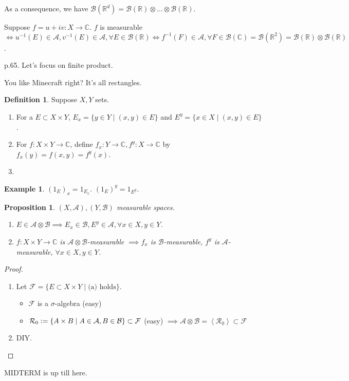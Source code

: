 \documentclass{report}
\newcommand{\R}{\mathbb{R}}
\newcommand{\C}{\mathbb{C}}
\newcommand{\cA}{\mathcal{A}}
\newcommand{\cB}{\mathcal{B}}
\newcommand{\gen}[1]{\left\langle #1 \right\rangle}
\newcommand{\defeq}{\vcentcolon=}
\newtheorem{proposition}[theorem]{Proposition}
\theoremstyle{definition}
\newtheorem{definition}[theorem]{Definition}
\newtheorem{example}[theorem]{Example}
\theoremstyle{remark}
\begin{document}
As a consequence, we have $\cB(\R^d) = \cB(\R) \otimes \ldots \otimes \cB(\R)$.

Suppose $f = u + iv: X \to \C$. $f$ is measurable $\iff u^{-1}(E) \in \cA, v^{-1}(E) \in \cA, \forall E \in \cB(\R) \iff f^{-1}(F) \in \cA, \forall F \in \cB(\C) = \cB(\R^2) = \cB(\R) \otimes \cB(\R)$. 

p.65.
Let's focus on finite product.

\epigraph{You like Minecraft right? It's all rectangles.}{}

\begin{definition}
	Suppose $X, Y$ sets.
	\begin{enumerate}
		\item For a $E \subset X \times Y$, $E_x = \{y \in Y \mid (x, y) \in E\}$ and $E^y = \{x \in X \mid (x, y) \in E\}$.
		\item For $f: X \times Y \to \C$, define $f_x: Y \to \C, f^y: X \to \C$ by $f_x(y) = f(x, y) = f^y(x)$.
		\item 
	\end{enumerate}
\end{definition}
\begin{example}
	$(1_E)_x = 1_{E_x}$. $(1_E)^y = 1_{E^y}$.
\end{example}

\begin{proposition}
	$(X, \cA), (Y, \cB)$ measurable spaces.
	\begin{enumerate}
		\item $E \in \cA \otimes \cB \implies E_x \in \cB, E^y \in \cA, \forall x \in X, y \in Y$.
		\item $f: X \times Y \to \C$ is $\cA \otimes \cB$-measurable $\implies f_x$ is $\cB$-measurable, $f^y$ is $\cA$-measurable, $\forall x \in X, y \in Y$.
	\end{enumerate}
\end{proposition}
\begin{proof}
	\begin{enumerate}
		\item Let $\mathcal{F} = \{E \subset X \times Y \mid \text{(a) holds}\}$. \begin{itemize}
			\item $\mathcal{F}$ is a $\sigma$-algebra (easy)
			\item $\mathcal{R}_0 \defeq \{A \times B \mid A \in \cA, B \in \cB\} \subset \mathcal{F}$ (easy) $\implies \cA \otimes \cB  = \gen{\mathcal{R}_0} \subset \mathcal{F}$
		\end{itemize}
		\item DIY. \qedhere
	\end{enumerate}
\end{proof}
MIDTERM is up till here.
\end{document}
